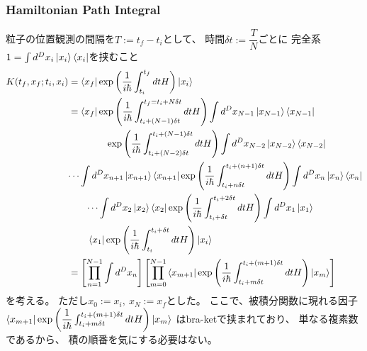 \subsubsection{Hamiltonian Path Integral}

粒子の位置観測の間隔を$T := t_f - t_i$として、
時間$\delta t := \dfrac{ T }{ N }$ごとに
完全系$
    1 = \int d^D {x_i}
        \ket{ x_i }
        \bra{ x_i }
$を挟むこと
\begin{align}
    K( t_f, x_f ; t_i, x_i )
&=
    \bra{ x_f }
        \exp\left(
            \dfrac{ 1 }{ i\hbar }
            \int_{t_i}^{t_f}dt
            H
        \right)
    \ket{ x_i }
\notag\\&=
    \bra{ x_f }
    \exp\left(
        \dfrac{1}{i\hbar}
        \int_{t_i + (N-1) \delta t}
            ^{t_f = t_i + N \delta t}
        dt H
    \right)
    \int d^D x_{N-1}
        \ket{ x_{N-1} }
        \bra{ x_{N-1} }
\notag\\&\qquad\qquad
    \exp\left(
        \dfrac{1}{i\hbar}
        \int_{t_i + (N-2) \delta t}
            ^{t_i + (N-1) \delta t}
        dt H
    \right)
    \int d^D x_{N-2}
        \ket{ x_{N-2} }
        \bra{ x_{N-2} }
\notag\\&\dots
    \int d^D x_{n+1}
        \ket{ x_{n+1} }
        \bra{ x_{n+1} }
    \exp\left(
        \dfrac{1}{i\hbar}
        \int_{t_i + n \delta t}
            ^{t_i + (n+1) \delta t}
        dt H
    \right)
    \int d^D x_n
        \ket{ x_n }
        \bra{ x_n }
\notag\\&\qquad\dots
    \int d^D x_2
        \ket{ x_2 }
        \bra{ x_2 }
    \exp\left(
        \dfrac{1}{i\hbar}
        \int_{t_i + \delta t}
        ^{t_i + 2 \delta t}
        dt H
    \right)
    \int d^D x_1
        \ket{ x_1 }
\notag\\&\qquad
        \bra{ x_1 }
    \exp\left(
        \dfrac{1}{i\hbar}
        \int_{t_i}
        ^{t_i + \delta t}
        dt H
    \right)
    \ket{ x_i }
\notag\\&=
    \left[
        \prod_{n=1}^{N-1}
        \int d^D x_n
    \right]
    \left[
        \prod_{m=0}^{N-1}
        \bra{ x_{m+1} }
        \exp\left(
            \dfrac{1}{i\hbar}
            \int_{t_i + m \delta t}
            ^{t_i + (m+1) \delta t}
            dt H
        \right)
        \ket{ x_m }
    \right]
\end{align}
を考える。
ただし$x_0 := x_i,\ x_N := x_f$とした。
ここで、被積分関数に現れる因子
$\bra{ x_{m+1} }
    \exp\left(
        \dfrac{1}{i\hbar}
        \int_{t_i + m \delta t}
        ^{t_i + (m+1) \delta t}
        dt H
    \right)
\ket{ x_m }$
はbra-ketで挟まれており、
単なる複素数であるから、
積の順番を気にする必要はない。

